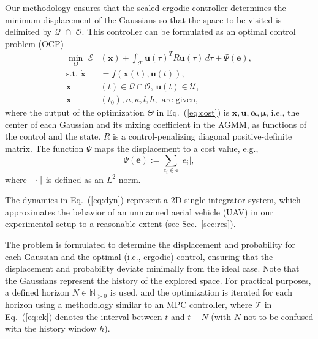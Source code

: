 \documentclass[letterpaper, 10 pt, conference, twoside]{IEEEtran}
\theoremstyle{definition}
\begin{document}
Our methodology ensures that the scaled ergodic controller determines the minimum displacement of the Gaussians so that the space to be visited is delimited by $\mathcal{Q}\,\,\cap\,\,\mathcal{O}$. This controller can be formulated as an optimal control problem (OCP) 
\begin{subequations}\label{eq:ocp}\begin{align}
   \min_{\Theta}\,\,\mathcal{E}&(\mathbf{x})+\int_{\mathcal{T}}\mathbf{u}(\tau)^TR\mathbf{u}(\tau)\,d\tau+\Psi(\mathbf{e}),\label{eq:cost}\\
  \text{s.t. }\dot{\mathbf{x}}&=f(\mathbf{x}(t),\mathbf{u}(t)),\label{eq:dyn}\\
  \mathbf{x}&(t)\in\mathcal{Q}\cap\mathcal{O},\,\mathbf{u}(t)\in\mathcal{U},\label{eq:const}\\
  \mathbf{x}&(t_0),n,\kappa,l,h,\text{ are given},\label{eq:ocpconsttotf}
\end{align}\end{subequations}
where the output of the optimization $\Theta$ in Eq.~(\ref{eq:cost}) is $\mathbf{x},\mathbf{u},\boldsymbol{\alpha},\boldsymbol{\mu}$, i.e., the center of each Gaussian and its mixing coefficient in the AGMM, as functions of the control and the state. $R$ is a control-penalizing diagonal positive-definite matrix. The function $\Psi$ maps the displacement to a cost value, e.g., 
\begin{equation}
  \Psi(\mathbf{e}):=\sum_{e_i\in\mathbf{e}}|e_i|,
\end{equation}
where $|\hspace{.2ex}\cdot\hspace{.2ex}|$ is defined as an $L^2$-norm.

The dynamics in Eq.~(\ref{eq:dyn}) represent a 2D single integrator system, which approximates the behavior of an unmanned aerial vehicle (UAV) in our experimental setup to a reasonable extent (see Sec.~\ref{sec:res}).

The problem is formulated to determine the displacement and probability for each Gaussian and the optimal (i.e., ergodic) control, ensuring that the displacement and probability deviate minimally from the ideal case. Note that the Gaussians represent the history of the explored space. For practical purposes, a defined horizon $N \in \mathbb{N}_{>0}$ is used, and the optimization is iterated for each horizon using a methodology similar to an MPC controller, where $\mathcal{T}$ in Eq.~(\ref{eq:ck}) denotes the interval between $t$ and $t-N$ (with $N$ not to be confused with the history window $h$).
\end{document}
